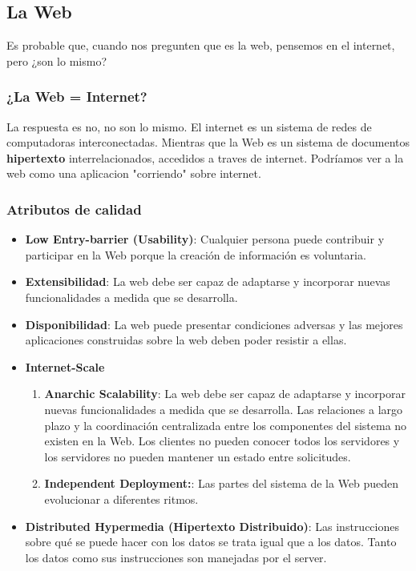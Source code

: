\documentclass{article}
\begin{document}
		
		
		\subsection{La Web}
		Es probable que, cuando nos pregunten que es la web, pensemos en el internet, pero ¿son lo mismo?
		\subsubsection{¿La Web = Internet?}
		La respuesta es no, no son lo mismo. 
		El internet es un sistema de redes de computadoras interconectadas. Mientras que la Web es un sistema de documentos \textbf{hipertexto} interrelacionados, accedidos a traves de internet. Podríamos ver a la web como una aplicacion "corriendo" sobre internet.
		
		\subsubsection{Atributos de calidad}
		\begin{itemize}		
			\item \textbf{Low Entry-barrier (Usability)}: Cualquier persona puede contribuir y participar en la Web porque la creación de información es voluntaria.
			
			\item \textbf{Extensibilidad}: La web debe ser capaz de adaptarse y incorporar nuevas funcionalidades a medida que se desarrolla.
			
			\item \textbf{Disponibilidad}: La web puede presentar condiciones adversas y las mejores aplicaciones construidas sobre la web deben poder resistir a ellas.
			
			\item \textbf{Internet-Scale}
			\begin{enumerate}
				\item \textbf{Anarchic Scalability}: La web debe ser capaz de adaptarse y incorporar nuevas funcionalidades a medida que se desarrolla. Las relaciones a largo plazo y la coordinación centralizada entre los componentes del sistema no existen en la Web. Los clientes no pueden conocer todos los servidores y los servidores no pueden mantener un estado entre solicitudes.	
				
				\item \textbf{Independent Deployment:}: Las partes del sistema de la Web pueden evolucionar a diferentes ritmos.
			\end{enumerate}
			
			\item \textbf{Distributed Hypermedia (Hipertexto Distribuido)}: Las instrucciones sobre qué se puede hacer con los datos se trata igual que a los datos. Tanto los datos como sus instrucciones son manejadas por el server.

			
		\end{itemize}
		
\end{document}
